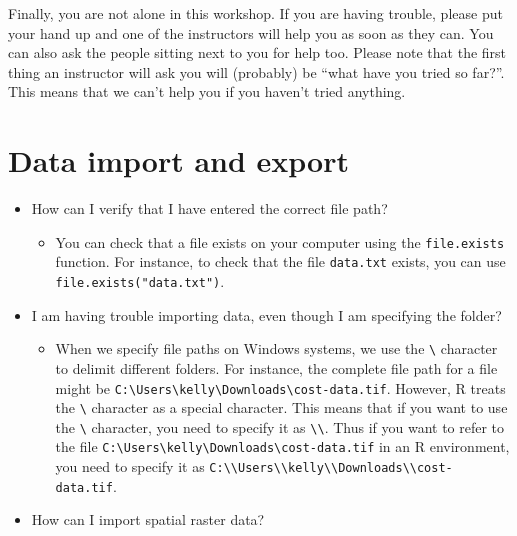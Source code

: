 \documentclass[]{book}
\providecommand{\tightlist}{%
  \setlength{\itemsep}{0pt}\setlength{\parskip}{0pt}}
\begin{document}
Finally, you are not alone in this workshop. If you are having trouble,
please put your hand up and one of the instructors will help you as soon
as they can. You can also ask the people sitting next to you for help
too. Please note that the first thing an instructor will ask you will
(probably) be ``what have you tried so far?''. This means that we can't
help you if you haven't tried anything.

\chapter{Data import and export}\label{data-import-and-export}

\begin{itemize}
\item
  How can I verify that I have entered the correct file path?

  \begin{itemize}
  \tightlist
  \item
    You can check that a file exists on your computer using the
    \texttt{file.exists} function. For instance, to check that the file
    \texttt{data.txt} exists, you can use
    \texttt{file.exists("data.txt")}.
  \end{itemize}
\item
  I am having trouble importing data, even though I am specifying the
  folder?

  \begin{itemize}
  \tightlist
  \item
    When we specify file paths on Windows systems, we use the
    \texttt{\textbackslash{}} character to delimit different folders.
    For instance, the complete file path for a file might be
    \texttt{C:\textbackslash{}Users\textbackslash{}kelly\textbackslash{}Downloads\textbackslash{}cost-data.tif}.
    However, R treats the \texttt{\textbackslash{}} character as a
    special character. This means that if you want to use the
    \texttt{\textbackslash{}} character, you need to specify it as
    \texttt{\textbackslash{}\textbackslash{}}. Thus if you want to refer
    to the file
    \texttt{C:\textbackslash{}Users\textbackslash{}kelly\textbackslash{}Downloads\textbackslash{}cost-data.tif}
    in an R environment, you need to specify it as
    \texttt{C:\textbackslash{}\textbackslash{}Users\textbackslash{}\textbackslash{}kelly\textbackslash{}\textbackslash{}Downloads\textbackslash{}\textbackslash{}cost-data.tif}.
  \end{itemize}
\item
  How can I import spatial raster data?


\end{itemize}
\end{document}
